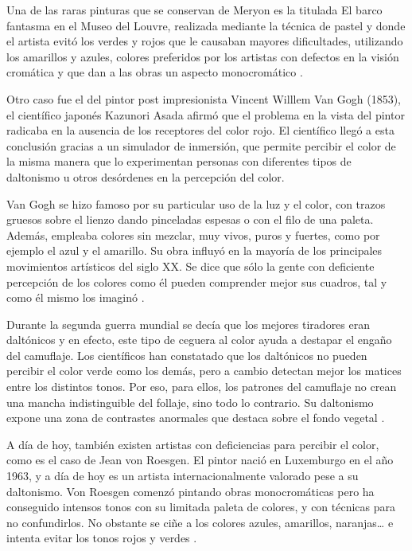 \documentclass[10pt]{article}
\begin{document}
\setlength{\parskip}{2mm}

Una de las raras pinturas que se conservan de Meryon es la titulada El barco fantasma en el Museo del Louvre, realizada mediante la técnica de pastel y donde el artista evitó los verdes y rojos que le causaban mayores dificultades, utilizando los amarillos y azules, colores preferidos por los artistas con defectos en la visión cromática y que dan a las obras un aspecto monocromático \cite{IEEEreferencias:Ref5}.

\setlength{\parskip}{2mm}

Otro caso fue el del  pintor post impresionista Vincent Willlem Van Gogh (1853), el científico japonés Kazunori Asada afirmó que el problema en la vista del pintor radicaba en la ausencia de los receptores del color rojo. El científico llegó a esta conclusión gracias a un simulador de inmersión, que permite percibir el color de la misma manera que lo experimentan personas con diferentes tipos de daltonismo u otros desórdenes en la percepción del color.

\setlength{\parskip}{2mm}

Van Gogh se hizo famoso por su particular uso de la luz y el color, con trazos gruesos sobre el lienzo dando pinceladas espesas o con el filo de una paleta. Además, empleaba colores sin mezclar, muy vivos, puros y fuertes, como por ejemplo el azul y el amarillo. Su obra influyó en la mayoría de los principales movimientos artísticos del siglo XX. Se dice que sólo la gente con deficiente percepción de los colores como él pueden comprender mejor sus cuadros, tal y como él mismo los imaginó \cite{IEEEreferencias:Ref6}.

\setlength{\parskip}{2mm}

Durante la segunda guerra mundial se decía que los mejores tiradores eran daltónicos y en efecto, este tipo de ceguera al color ayuda a destapar el engaño del camuflaje. Los científicos han constatado que los daltónicos no pueden percibir el color verde como los demás, pero a cambio detectan mejor los matices entre los distintos tonos. Por eso, para ellos, los patrones del camuflaje no crean una mancha indistinguible del follaje, sino todo lo contrario. Su daltonismo expone una zona de contrastes anormales que destaca sobre el fondo vegetal \cite{IEEEreferencias:Ref7}.

\setlength{\parskip}{2mm}

A día de hoy, también existen artistas con deficiencias para percibir el color, como es el caso de Jean von Roesgen. El pintor nació en Luxemburgo en el año 1963, y a día de hoy es un artista internacionalmente valorado pese a su daltonismo. Von Roesgen comenzó pintando obras monocromáticas pero ha conseguido intensos tonos con su limitada paleta de colores, y con técnicas para no confundirlos. No obstante se ciñe a los colores azules, amarillos, naranjas… e intenta evitar los tonos rojos y verdes \cite{IEEEreferencias:Ref6}.
\end{document}
